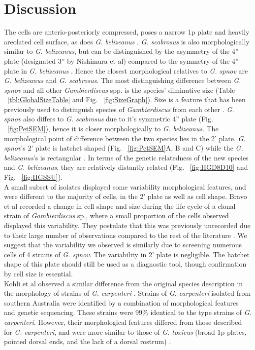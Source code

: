 \documentclass[12pt]{article}
\begin{document}
\newpage
\section{Discussion}
The cells are anterio-posteriorly compressed, poses a narrow 1p plate and heavily areolated cell surface, as does \emph{G. belizeanus} \citep{litaker2009taxonomy}. \emph{G. scabrosus} is also morphologically similar to \emph{G. belizeanus}, but can be distinguished by the asymmetry of the 4'' plate (designated 3'' by Nishimura et al) compared to the symmetry of the 4'' plate in \emph{G. belizeanus} \citep{nishimura2014morphology}. Hence the closest morphological relatives to \emph{G. spnov} are \emph{G. belizeanus} and \emph{G. scabrosus}. The most distinguishing difference between \emph{G. spnov} and all other \emph{Gambierdiscus} spp. is the species' diminutive size (Table ~\ref{tbl:GlobalSizeTable} and Fig. ~\ref{fig:SizeGraph}). Size is a feature that has been previously used to distinguish species of \emph{Gambierdiscus} from each other \citep{litaker2009taxonomy}. 
\emph{G. spnov} also differs to \emph{G. scabrosus} due to it's symmetric 4'' plate (Fig. ~\ref{fig:PetSEM}), hence it is closer morphologically to \emph{G. belizeanus}. The morphological point of difference between the two species lies in the 2' plate. \emph{G. spnov}'s 2' plate is hatchet shaped (Fig. ~\ref{fig:PetSEM}A, B and C) while the \emph{G. belizeanus}'s is rectangular \citep{faust1995observation}. In terms of the genetic relatedness of the new species and \textit{G. belizeanus}, they are relatively distantly related (Fig. ~\ref{fig:HGD8D10} and Fig. ~\ref{fig:HGSSU}). \\
A small subset of isolates displayed some variability morphological features, and were different to the majority of cells, in the 2' plate as well as cell shape. Bravo et al recorded a change in cell shape and size during the life cycle of a clonal strain of \emph{Gambierdiscus} sp., where a small proportion of the cells observed displayed this variability. They postulate that this was previously unrecorded due to their large number of observations compared to the rest of the literature \citep{bravo2014cellular}. We suggest that the variability we observed is similarly due to screening numerous cells of 4 strains of \emph{G. spnov}. The variability in 2' plate is negligible. The hatchet shape of this plate should still be used as a diagnostic tool, though confirmation by cell size is essential.\\
Kohli et al observed a similar difference from the original species description in the morphology of strains of  \emph{G. carpenteri} \citep{kohli2014high}. Strains of \emph{G. carpenteri} isolated from southern Australia were identified by a combination of morphological features and genetic sequencing. These strains were 99\% identical to the type strains of \textit{G. carpenteri}. However, their morphological features differed from those described for \textit{G. carpenteri}, and were more similar to those of \emph{G. toxicus} (broad 1p plates, pointed dorsal ends, and the lack of a dorsal rostrum) \citep{kohli2014high,litaker2009taxonomy}.
\end{document}
